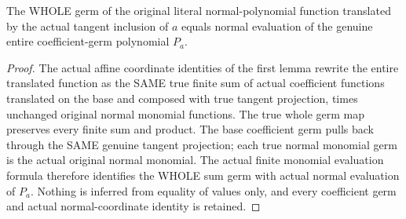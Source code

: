 \begin{lemma}
\label{hir:relative-normal-nearby-whole-polynomial-evaluation-dictionary}
\leanok
The WHOLE germ of the original literal normal-polynomial function translated by the actual tangent inclusion of $a$ equals normal evaluation of the genuine entire coefficient-germ polynomial $P_a$.
\end{lemma}
\begin{proof}
The actual affine coordinate identities of the first lemma rewrite the entire translated function as the SAME true finite sum of actual coefficient functions translated on the base and composed with true tangent projection, times unchanged original normal monomial functions. The true whole germ map preserves every finite sum and product. The base coefficient germ pulls back through the SAME genuine tangent projection; each true normal monomial germ is the actual original normal monomial. The actual finite monomial evaluation formula therefore identifies the WHOLE sum germ with actual normal evaluation of $P_a$. Nothing is inferred from equality of values only, and every coefficient germ and actual normal-coordinate identity is retained.
\end{proof}

